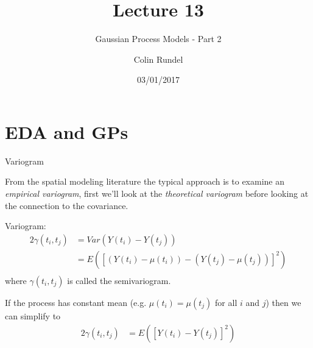 \documentclass[11pt,ignorenonframetext,]{beamer}
\title{Lecture 13}
\subtitle{Gaussian Process Models - Part 2}
\author{Colin Rundel}
\date{03/01/2017}
\begin{document}
\frame{\titlepage}

\section{EDA and GPs}\label{eda-and-gps}

\begin{frame}[t]{Variogram}

From the spatial modeling literature the typical approach is to examine
an \emph{empirical variogram}, first we'll look at the \emph{theoretical
variogram} before looking at the connection to the covariance.

\vspace{2mm}

\pause

Variogram: \[ \begin{aligned}
2 \gamma(t_i, t_j) 
  &= Var(Y(t_i) - Y(t_j)) \\
  &= E( [(Y(t_i)-\mu(t_i)) - (Y(t_j)-\mu(t_j))]^2)  \\
\end{aligned}\] where \(\gamma(t_i, t_j)\) is called the semivariogram.

\vspace{2mm}

\pause

If the process has constant mean (e.g. \(\mu(t_i) = \mu(t_j)\) for all
\(i\) and \(j\)) then we can simplify to \[ \begin{aligned}
2 \gamma(t_i, t_j) &= E( [Y(t_i)-Y(t_j)]^2)  \\
\end{aligned}\]

\end{frame}
\end{document}
